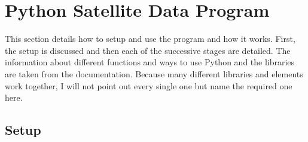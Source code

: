 \documentclass[../00_main.tex]{subfiles}
\begin{document}
\section{Python Satellite Data Program}

This section details how to setup and use the program and how it works.
First, the setup is discussed and then each of the successive stages are
detailed. The information about different functions and ways to use Python and
the libraries are taken from the documentation. Because many different
libraries and elements work together, I will not point out every single one but
name the required one here.

\subsection{Setup}
\end{document}
